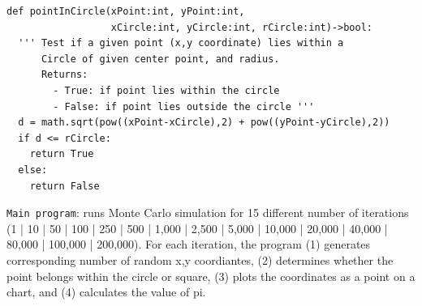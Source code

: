 \documentclass[UTF8, letter]{article}
\begin{document}
\begin{codeblock}
\begin{verbatim}
def pointInCircle(xPoint:int, yPoint:int, 
                  xCircle:int, yCircle:int, rCircle:int)->bool:
  ''' Test if a given point (x,y coordinate) lies within a 
      Circle of given center point, and radius.
      Returns: 
        - True: if point lies within the circle
        - False: if point lies outside the circle '''                  
  d = math.sqrt(pow((xPoint-xCircle),2) + pow((yPoint-yCircle),2))
  if d <= rCircle:
    return True
  else:
    return False
\end{verbatim}
\end{codeblock}

\begin{flushleft} 
\noindent
\texttt{Main program}: runs Monte Carlo simulation for 15 different number of iterations (1 | 10 | 50 | 100 | 250 | 500 | 1,000 | 2,500 | 5,000 |  10,000 | 20,000 | 40,000 | 80,000 | 100,000 | 200,000). For each iteration, the program (1) generates corresponding number of random x,y coordiantes, (2) determines whether the point belongs within the circle or square, (3) plots the coordinates as a point on a chart, and (4) calculates the value of pi.
\end{flushleft}
\end{document}
